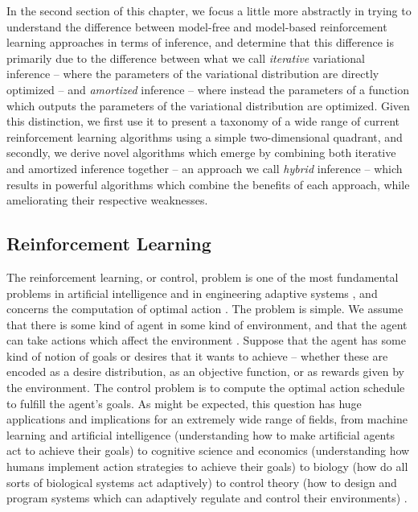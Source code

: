 In the second section of this chapter, we focus a little more abstractly in trying to understand the difference between model-free and model-based reinforcement learning approaches in terms of inference, and determine that this difference is primarily due to the difference between what we call \emph{iterative} variational inference -- where the parameters of the variational distribution are directly optimized -- and \emph{amortized} inference -- where instead the parameters of a function which outputs the parameters of the variational distribution are optimized. Given this distinction, we first use it to present a taxonomy of a wide range of current reinforcement learning algorithms using a simple two-dimensional quadrant, and secondly, we derive novel algorithms which emerge by combining both iterative and amortized inference together -- an approach we call \emph{hybrid} inference -- which results in powerful algorithms which combine the benefits of each approach, while ameliorating their respective weaknesses.

\subsection{Reinforcement Learning}

The reinforcement learning, or control, problem is one of the most fundamental problems in artificial intelligence and in engineering adaptive systems \citep{sutton1990integrated,sutton1998introduction,kaelbling1996reinforcement,dayan1997using}, and concerns the computation of optimal action \citep{wolpert1997computational,todorov2008general}. The problem is simple. We assume that there is some kind of agent in some kind of environment, and that the agent can take actions which affect the environment \citep{sutton1998introduction}.  Suppose that the agent has some kind of notion of goals or desires that it wants to achieve -- whether these are encoded as a desire distribution, as an objective function, or as rewards given by the environment. The control problem is to compute the optimal action schedule to fulfill the agent's goals. As might be expected, this question has huge applications and implications for an extremely wide range of fields, from machine learning and artificial intelligence (understanding how to make artificial agents act to achieve their goals) \citep{sutton1998introduction,mnih2013playing,silver2016mastering,schrittwieser2019mastering,schulman2015trust} to cognitive science and economics (understanding how humans implement action strategies to achieve their goals) \citep{todorov2008general,wolpert1997computational,dayan2008decision,daw2006cortical} to biology (how do all sorts of biological systems act adaptively) \citep{dayan2009goal,mehlhorn2015unpacking,krebs1978test,pyke1984optimal} to control theory (how to design and program systems which can adaptively regulate and control their environments) \citep{kirk2004optimal,kwakernaak1972linear,sethi2000optimal,kalman1960contributions,johnson2005pid,kappen2005path}.

